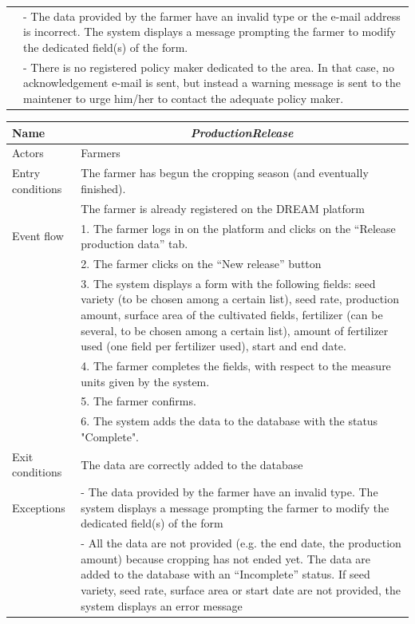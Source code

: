 \begin{table}[H]
\begin{tabularx}{\linewidth}{|l|X|}
		&-	The data provided by the farmer have an invalid type or the e-mail address is incorrect. The system displays a message prompting the farmer to modify the dedicated field(s) of the form. 
		\tabularnewline
		&-	There is no registered policy maker dedicated to the area. In that case, no acknowledgement e-mail is sent, but instead a warning message is sent to the maintener to urge him/her to contact the adequate policy maker. 
		\tabularnewline
		\hline
	\end{tabularx}   
\end{table}

\begin{table}[H]
	\centering
	\begin{tabularx}{\linewidth}{|l|X|}
		\hline
		Name & \multicolumn{1}{c|}{\textit{\textbf{ProductionRelease}}}                                                   \tabularnewline \hline
		Actors                                               & Farmers                                                    \tabularnewline \hline
		Entry conditions                                              & The farmer has begun the cropping season (and eventually finished). \tabularnewline
		&The farmer is already registered on the DREAM platform
		\tabularnewline \hline
		Event flow                                         & 1.	The farmer logs in on the platform and clicks on the “Release production data” tab.                                                                   \tabularnewline 
		& 2.	The farmer clicks on the “New release” button                                                   \tabularnewline 
		& 3.	The system displays a form with the following fields: seed variety (to be chosen among a certain list), seed rate, production amount, surface area of the cultivated fields, fertilizer (can be several, to be chosen among a certain list), amount of fertilizer used (one field per fertilizer used), start and end date.                                                 \tabularnewline 
		& 4.	The farmer completes the fields, with respect to the measure units given by the system.                                           \tabularnewline
		& 5.	The farmer confirms.                                               \tabularnewline
		& 6.	The system adds the data to the database with the status "Complete".      
		\tabularnewline \hline
		Exit conditions 
		& 
		The data are correctly added to the database
		\tabularnewline \hline
		Exceptions 
		& 
		-	The data provided by the farmer have an invalid type. The system displays a message prompting the farmer to modify the dedicated field(s) of the form
		\tabularnewline
		&-	All the data are not provided (e.g. the end date, the production amount) because cropping has not ended yet. The data are added to the database with an “Incomplete” status. If seed variety, seed rate, surface area or start date are not provided, the system displays an error message
		\tabularnewline
		\hline
	\end{tabularx}   
\end{table}

